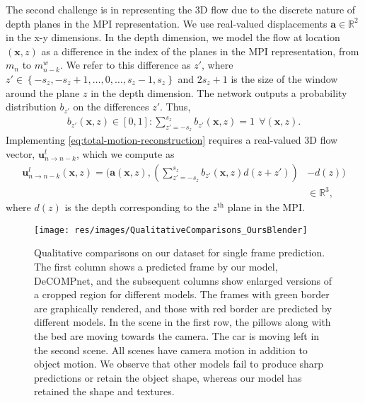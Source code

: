 \documentclass[preprint]{vgtc}
\begin{document}
    The second challenge is in representing the 3D flow due to the discrete nature of depth planes in the MPI representation.
    We use real-valued displacements $\mathbf{a} \in \mathbb{R}^2$ in the x-y dimensions.
    In the depth dimension, we model the flow at location $(\mathbf{x}, z)$ as a difference in the index of the planes in the MPI representation, from $m_n$ to $m^w_{n-k}$.
We refer to this difference as $z'$, where $z' \in \left\{ -s_z, -s_z+1, \ldots, 0, \ldots, s_z-1, s_z \right\}$ and $2 s_z + 1$ is the size of the window around the plane $z$ in the depth dimension.
    The network outputs a probability distribution $b_{z'}$ on the differences $z'$.
    Thus,
\begin{align}
      b_{z'}(\mathbf{x}, z) \in [0, 1] : \sum_{z'=-s_z}^{s_z} {b_{z'}(\mathbf{x}, z)} = 1 \ \ \forall (\mathbf{x}, z).  
    \end{align}
Implementing \autoref{eq:total-motion-reconstruction} requires a real-valued 3D flow vector, $\mathbf{u}^l_{n \rightarrow n-k}$, which we compute as
    \begin{align}
        \nonumber \mathbf{u}^l_{n \rightarrow n-k}\left(\mathbf{x}, z\right) = \Biggl( \mathbf{a}\left(\mathbf{x}, z\right), \left( \sum_{z'=-s_z}^{s_z} {b_{z'}\left(\mathbf{x}, z\right)} d\left(z + z'\right)\right)  & - d(z) \Biggr) \\
        & \in \mathbb{R}^3,
        \label{eq:flow-quantized-to-real}
    \end{align}
    where $d\left(z\right)$ is the depth corresponding to the $z^{\text{th}}$ plane in the MPI\@.




    \begin{figure*}
        \centering
        \texttt{[image: res/images/QualitativeComparisons\_OursBlender]}
        \caption{Qualitative comparisons on our dataset for single frame prediction.
        The first column shows a predicted frame by our model, DeCOMPnet, and the subsequent columns show enlarged versions of a cropped region for different models.
        The frames with green border are graphically rendered, and those with red border are predicted by different models.
In the scene in the first row, the pillows along with the bed are moving towards the camera.
        The car is moving left in the second scene.
        All scenes have camera motion in addition to object motion.
        We observe that other models fail to produce sharp predictions or retain the object shape, whereas our model has retained the shape and textures.
        }
        \label{fig:qualitative-comparisons-ours}
    \end{figure*}
\end{document}
